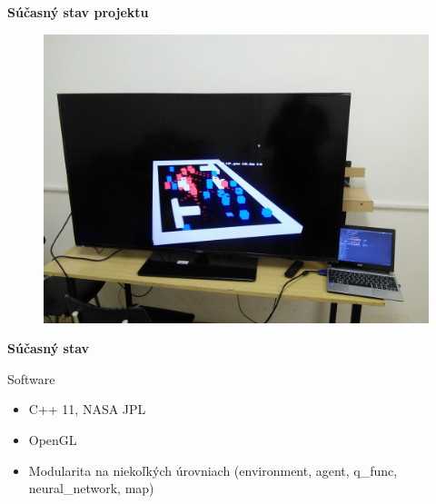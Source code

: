 \documentclass[xcolor=dvipsnames]{beamer}
\begin{document}
\begin{frame}{\bf Súčasný stav projektu}

\begin{figure}[ht]
\begin{center}
\begin{minipage}{0.8\linewidth}
\begin{center}
\includegraphics[width=1.0\textwidth]{images/aeris_02.jpg}
\end{center}
\end{minipage}
\end{center}
\end{figure}

\end{frame}


\begin{frame}{\bf Súčasný stav}

Software

\begin{itemize}
    \item C++ 11, NASA JPL
    \item OpenGL
    \item Modularita na niekoľkých úrovniach (environment, agent, q\_func, neural\_network, map)
    \end{itemize}


\end{frame}
\end{document}
